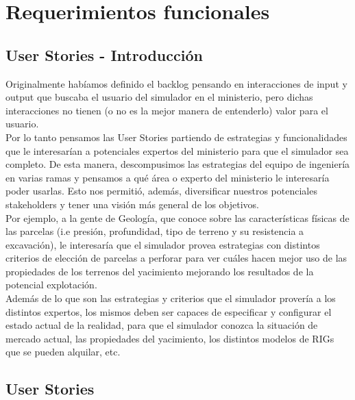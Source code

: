 \section{Requerimientos funcionales}

\newcommand{\BV}{Business Value}
\newcommand{\SP}{Story Points}
\newcommand{\US}[1]{\textbf{US #1}}
\newcommand{\UUSS}{User Stories}
\newcommand{\fixme}[1]{\large\textcolor{red}{#1}}

\subsection{User Stories - Introducción}

Originalmente habíamos definido el backlog pensando en interacciones de input y output que buscaba el usuario del simulador en el ministerio, pero dichas interacciones no tienen (o no es la mejor manera de entenderlo) valor para el usuario.
\\

Por lo tanto pensamos las User Stories partiendo de estrategias y funcionalidades que le interesarían a potenciales expertos del ministerio para que el simulador sea completo. De esta manera, descompusimos las estrategias del equipo de ingeniería en varias ramas y pensamos a qué área o experto del ministerio le interesaría poder usarlas. Esto nos permitió, además, diversificar nuestros potenciales stakeholders y tener una visión más general de los objetivos.
\\

Por ejemplo, a la gente de Geología, que conoce sobre las características físicas de las parcelas (i.e presión, profundidad, tipo de terreno y su resistencia a excavación), le interesaría que el simulador provea estrategias con distintos criterios de elección de parcelas a perforar para ver cuáles hacen mejor uso de las propiedades de los terrenos del yacimiento mejorando los resultados de la potencial explotación.\\

Además de lo que son las estrategias y criterios que el simulador provería a los 
distintos expertos, los mismos deben ser capaces de especificar y configurar el estado 
actual de la realidad, para que el simulador conozca la situación de mercado actual, 
las propiedades del yacimiento, los distintos modelos de RIGs que se pueden alquilar, etc. 

\subsection{User Stories}


